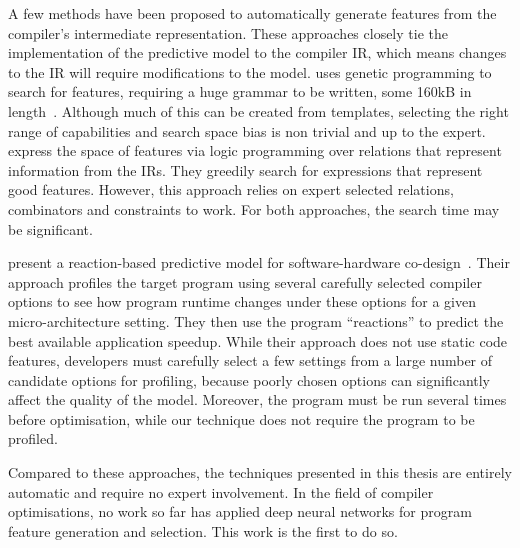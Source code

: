 A few methods have been proposed to automatically generate features from the compiler's intermediate representation. These approaches closely tie the implementation of the predictive model to the compiler IR, which means changes to the IR will require modifications to the model.
\citeauthor{Leather2014} uses genetic programming to search for features, requiring a huge grammar to be written, some 160kB in length~\cite{Leather2014}. Although much of this can be created from templates, selecting the right range of capabilities and search space bias is non trivial and up to the expert.
\citeauthor{Namolaru2010a} express the space of features via logic programming over relations that represent information from the IRs. They greedily search for expressions that represent good features. However, this approach relies on expert selected relations, combinators and constraints to work. For both approaches, the search time may be significant.

\citeauthor{Cavazos2006} present a reaction-based predictive model for software-hardware co-design~\cite{Cavazos2006}. Their approach profiles the target program using several carefully selected compiler options to see how program runtime changes under these options for a given micro-architecture setting. They then use the program ``reactions'' to predict the best available application speedup. While their approach does not use static code features, developers must carefully select a few settings from a large number of candidate options for profiling, because poorly chosen options can significantly affect the quality of the model. Moreover, the program must be run several times before optimisation, while our technique does not require the program to be profiled.

Compared to these approaches, the techniques presented in this thesis are entirely automatic and require no expert involvement. In the field of compiler optimisations, no work so far has applied deep neural networks for program feature generation and selection. This work is the first to do so.


